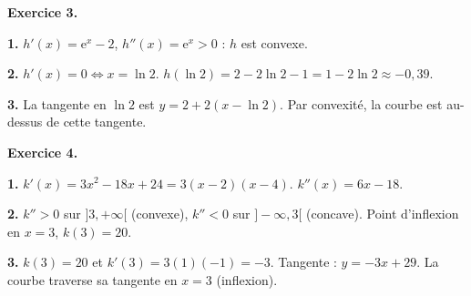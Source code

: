 \bigskip

\textbf{Exercice 3.}

\textbf{1.} $h'(x) = \mathrm{e}^x - 2$, $h''(x) = \mathrm{e}^x > 0$ : $h$ est convexe.

\textbf{2.} $h'(x) = 0 \iff x = \ln 2$. $h(\ln 2) = 2 - 2\ln 2 - 1 = 1 - 2\ln 2 \approx -0{,}39$.

\textbf{3.} La tangente en $\ln 2$ est $y = 2 + 2(x - \ln 2)$. Par convexité, la courbe est au-dessus de cette tangente.

\bigskip

\textbf{Exercice 4.}

\textbf{1.} $k'(x) = 3x^2 - 18x + 24 = 3(x-2)(x-4)$. $k''(x) = 6x - 18$.

\textbf{2.} $k'' > 0$ sur $]3, +\infty[$ (convexe), $k'' < 0$ sur $]-\infty, 3[$ (concave). Point d'inflexion en $x = 3$, $k(3) = 20$.

\textbf{3.} $k(3) = 20$ et $k'(3) = 3(1)(-1) = -3$. Tangente : $y = -3x + 29$. La courbe traverse sa tangente en $x = 3$ (inflexion).

